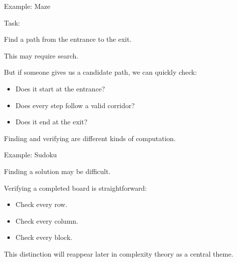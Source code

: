 \documentclass[10pt,aspectratio=169]{beamer}
\begin{document}
\begin{frame}{Example: Maze}

Task:

\begin{center}
Find a path from the entrance to the exit.
\end{center}

\vspace{1em}

This may require search.

\pause

\vspace{1em}

But if someone gives us a candidate path, we can quickly check:

\begin{itemize}
\item Does it start at the entrance?
\item Does every step follow a valid corridor?
\item Does it end at the exit?
\end{itemize}

\vspace{0.5em}

\pause
Finding and verifying are different kinds of computation.

\end{frame}

\begin{frame}{Example: Sudoku}

Finding a solution may be difficult.

\vspace{1em}

Verifying a completed board is straightforward:

\begin{itemize}
\item Check every row.
\item Check every column.
\item Check every block.
\end{itemize}

\vspace{1em}

\pause
This distinction will reappear later in complexity theory as a central theme.

\end{frame}
\end{document}
